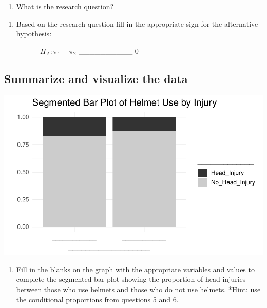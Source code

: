 \documentclass[
]{report}
\providecommand{\tightlist}{%
  \setlength{\itemsep}{0pt}\setlength{\parskip}{0pt}}
\begin{document}
\vspace{1in}

\begin{enumerate}
\def\labelenumi{\arabic{enumi}.}
\setcounter{enumi}{9}
\tightlist
\item
  What is the research question?
\end{enumerate}

\vspace{1in}

\begin{enumerate}
\def\labelenumi{\arabic{enumi}.}
\setcounter{enumi}{10}
\tightlist
\item
  Based on the research question fill in the appropriate sign for the alternative hypothesis:
  \vspace{0.25in}
\end{enumerate}

~~~~~~~~~~\(H_A: \pi_1 -\pi_2\) \_\_\_\_\_\_\_\_\_\_ 0

\hypertarget{summarize-and-visualize-the-data}{%
\subsection{Summarize and visualize the data}\label{summarize-and-visualize-the-data}}

\begin{center}\includegraphics[width=0.7\linewidth]{07-inference-2cat_files/figure-latex/unnamed-chunk-2-1} \end{center}

\begin{enumerate}
\def\labelenumi{\arabic{enumi}.}
\setcounter{enumi}{11}
\tightlist
\item
  Fill in the blanks on the graph with the appropriate variables and values to complete the segmented bar plot showing the proportion of head injuries between those who use helmets and those who do not use helmets. *Hint: use the conditional proportions from questions 5 and 6.
\end{enumerate}
\end{document}
